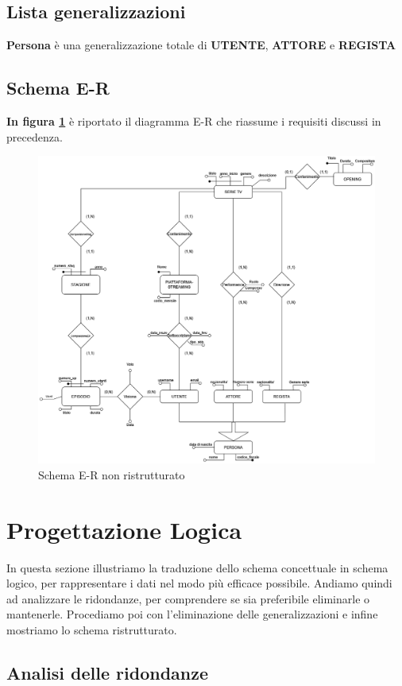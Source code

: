 \documentclass[10pt,a4paper]{article}
\begin{document}
\subsection{Lista generalizzazioni}
\textbf{Persona} è una generalizzazione totale di \textbf{UTENTE}, \textbf{ATTORE} e \textbf{REGISTA} 

\subsection{Schema E-R}
\textbf{In figura \ref{fig:no-ristrutt}} è riportato il diagramma E-R che riassume i requisiti discussi in precedenza.
\begin{figure}[h]
    \centering
    \includegraphics[scale=0.4]{schema-no-ristrutt.png}
    \caption{Schema E-R non ristrutturato}
    \label{fig:no-ristrutt}
\end{figure}
\section{Progettazione Logica}
In questa sezione illustriamo la traduzione dello schema concettuale in schema logico, per rappresentare i dati nel modo più efficace possibile. 
Andiamo quindi ad analizzare le ridondanze, per comprendere se sia preferibile eliminarle o mantenerle. 
Procediamo poi con l'eliminazione delle generalizzazioni e infine mostriamo lo schema ristrutturato.
\subsection{Analisi delle ridondanze}
\end{document}
